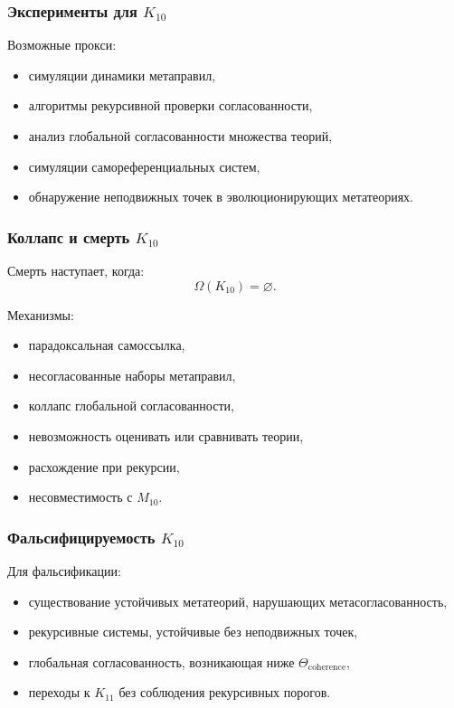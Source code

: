 \subsubsection{Эксперименты для $K_{10}$}

Возможные прокси:
\begin{itemize}
    \item симуляции динамики метаправил,
    \item алгоритмы рекурсивной проверки согласованности,
    \item анализ глобальной согласованности множества теорий,
    \item симуляции самореференциальных систем,
    \item обнаружение неподвижных точек в эволюционирующих метатеориях.
\end{itemize}

\subsubsection{Коллапс и смерть $K_{10}$}

Смерть наступает, когда:
\[
\Omega(K_{10})=\varnothing.
\]

Механизмы:
\begin{itemize}
    \item парадоксальная самоссылка,
    \item несогласованные наборы метаправил,
    \item коллапс глобальной согласованности,
    \item невозможность оценивать или сравнивать теории,
    \item расхождение при рекурсии,
    \item несовместимость с $M_{10}$.
\end{itemize}

\subsubsection{Фальсифицируемость $K_{10}$}

Для фальсификации:
\begin{itemize}
    \item существование устойчивых метатеорий, нарушающих метасогласованность,
    \item рекурсивные системы, устойчивые без неподвижных точек,
    \item глобальная согласованность, возникающая ниже $\Theta_{\mathrm{coherence}}$,
    \item переходы к $K_{11}$ без соблюдения рекурсивных порогов.
\end{itemize}

